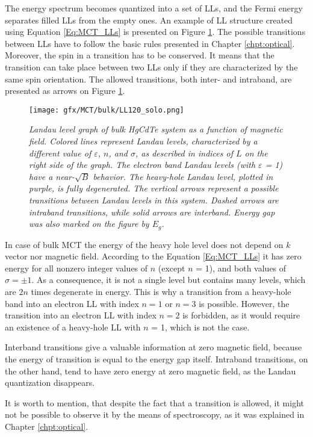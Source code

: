 \documentclass[titlepage,a4paper]{book}
\begin{document}
The energy spectrum becomes quantized into a set of LLs, and the Fermi energy separates filled LLs from the empty ones. An example of LL structure created using Equation \ref{Eq:MCT_LLs} is presented on Figure \ref{fig:MCT_LL120_solo}. The possible transitions between LLs have to follow the basic rules presented in Chapter \ref{chpt:optical}. Moreover, the spin in a transition has to be conserved. It means that the transition can take place between two LLs only if they are characterized by the same spin orientation. The allowed transitions, both inter- and intraband, are presented as arrows on Figure \ref{fig:MCT_LL120_solo}. 
\begin{figure}[ht]
	\centering
	\texttt{[image: gfx/MCT/bulk/LL120\_solo.png]}
	\vspace{-10pt}
	\caption{\textit{Landau level graph of bulk HgCdTe system as a function of magnetic field. Colored lines represent Landau levels, characterized by a different value of $\varepsilon$, $n$, and $\sigma$, as described in indices of $L$ on the right side of the graph. The electron band Landau levels (with $\varepsilon$ = 1) have a near-$\sqrt{B}$ behavior. The heavy-hole Landau level, plotted in purple, is fully degenerated. The vertical arrows represent a possible transitions between Landau levels in this system. Dashed arrows are intraband transitions, while solid arrows are interband. Energy gap was also marked on the figure by $E_g$.}}
	\label{fig:MCT_LL120_solo}
\end{figure}

In case of bulk MCT the energy of the heavy hole level does not depend on $k$ vector nor magnetic field. According to the Equation \ref{Eq:MCT_LLs} it has zero energy for all nonzero integer values of $n$ (except $n$ = 1), and both values of $\sigma = \pm 1$. As a consequence, it is not a single level but contains many levels, which are $2n$ times degenerate in energy. This is why a transition from a heavy-hole band into an electron LL with index $n = 1$ or $n = 3$  is possible. However, the transition into an electron LL with index $n = 2$ is forbidden, as it would require an existence of a heavy-hole LL with $n$ = 1, which is not the case. 

Interband transitions give a valuable information at zero magnetic field, because the energy of transition is equal to the energy gap itself. Intraband transitions, on the other hand, tend to have zero energy at zero magnetic field, as the Landau quantization disappears.

It is worth to mention, that despite the fact that a transition is allowed, it might not be possible to observe it by the means of spectroscopy, as it was explained in Chapter \ref{chpt:optical}.
\end{document}
